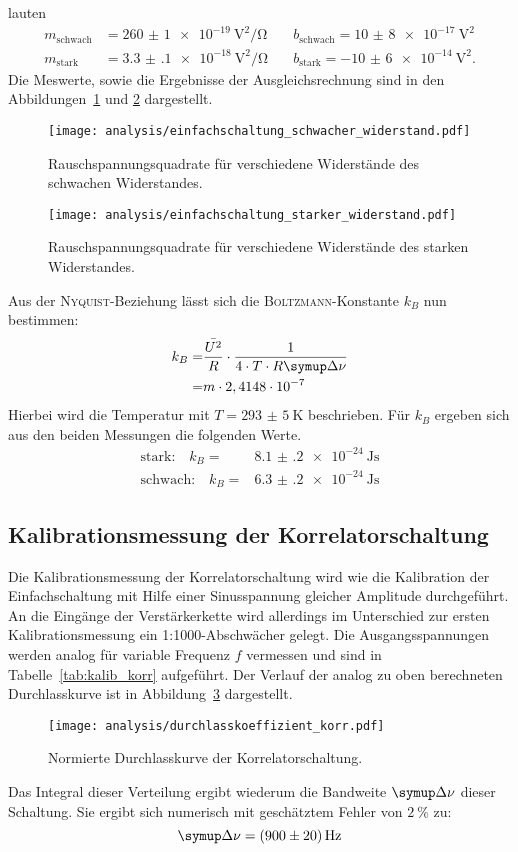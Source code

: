 lauten
%
\begin{align*}
  m_\text{schwach}&=\SI{260(1)e-19}{\volt\squared\per\ohm} \quad &b_\text{schwach}=\SI{10(8)e-17}{\volt\squared} \\ m_\text{stark}&=\SI{3.3(1)e-18}{\volt\squared\per\ohm} \quad &b_\text{stark}=\SI{-10(6)e-14}{\volt\squared}.
\end{align*}
%
Die Meswerte, sowie die Ergebnisse der Ausgleichsrechnung sind in den Abbildungen~\ref{fig:r_schwach} und \ref{fig:r_stark} dargestellt.
%
\begin{figure}
  \centering
  \texttt{[image: analysis/einfachschaltung\_schwacher\_widerstand.pdf]}
  \caption{Rauschspannungsquadrate für verschiedene Widerstände des schwachen Widerstandes.}
  \label{fig:r_schwach}
\end{figure}
%
%
\begin{figure}
  \centering
  \texttt{[image: analysis/einfachschaltung\_starker\_widerstand.pdf]}
  \caption{Rauschspannungsquadrate für verschiedene Widerstände des starken Widerstandes.}
  \label{fig:r_stark}
\end{figure}
%

Aus der \textsc{Nyquist}-Beziehung lässt sich die \textsc{Boltzmann}-Konstante $k_B$ nun bestimmen:
%
\begin{align*}
  k_B=&\frac{\bar{U^2}}{R}\cdot\frac{1}{4\cdot T\cdot R\upD\nu} \\
     =&m\cdot2,4148\cdot10^{-7}
\end{align*}
%
Hierbei wird die Temperatur mit $T=\SI{293(5)}{\kelvin}$ beschrieben. Für $k_{B}$ ergeben sich aus den beiden Messungen die folgenden Werte.
%
\begin{align}
  \text{stark:}\quad k_{B}=&\SI{8.1(2)e-24}{\joule\second} \\
  \text{schwach:}\quad k_{B}=&\SI{6.3(2)e-24}{\joule\second}
\end{align}
%
\subsection{Kalibrationsmessung der Korrelatorschaltung}
%
Die Kalibrationsmessung der Korrelatorschaltung wird wie die Kalibration der Einfachschaltung mit Hilfe einer Sinusspannung gleicher Amplitude durchgeführt. An die Eingänge der Verstärkerkette wird allerdings im Unterschied zur ersten Kalibrationsmessung ein 1:1000-Abschwächer gelegt. Die Ausgangsspannungen werden analog für variable Frequenz $f$ vermessen und sind in Tabelle~\ref{tab:kalib_korr} aufgeführt.
Der Verlauf der analog zu oben berechneten Durchlasskurve ist in Abbildung~\ref{fig:korr_beta} dargestellt.
%
\begin{figure}
  \centering
  \texttt{[image: analysis/durchlasskoeffizient\_korr.pdf]}
  \caption{Normierte Durchlasskurve der Korrelatorschaltung.}
  \label{fig:korr_beta}
\end{figure}
%
Das Integral dieser Verteilung ergibt wiederum die Bandweite $\upD\nu$ dieser Schaltung. Sie ergibt sich numerisch mit geschätztem Fehler von $\SI{2}{\percent}$ zu:
%
\begin{equation}
  \upD\nu = \SI{900(20)}{\hertz}
\end{equation}
%
